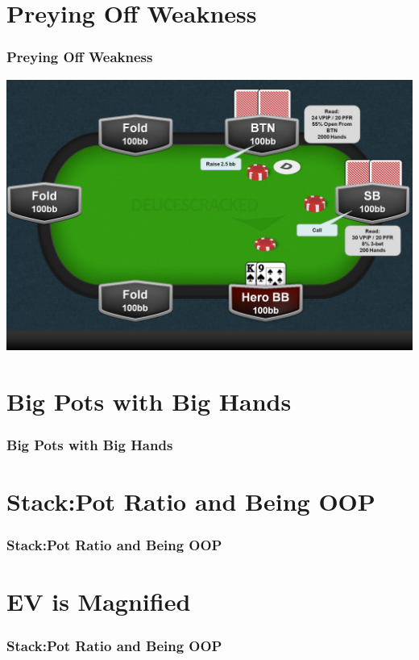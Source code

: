 \documentclass{beamer}
\begin{document}
\section{Preying Off Weakness}
\begin{frame}
\frametitle{Preying Off Weakness}
\includegraphics[keepaspectratio=true,width=.75\paperwidth]{Weakness.png}
\end{frame}

\section{Big Pots with Big Hands}
\begin{frame}
\frametitle{Big Pots with Big Hands}
\end{frame}

\section{Stack:Pot Ratio and Being OOP}
\begin{frame}
\frametitle{Stack:Pot Ratio and Being OOP}
\end{frame}

\section{EV is Magnified}
\begin{frame}
\frametitle{Stack:Pot Ratio and Being OOP}
\end{frame}
\end{document}

